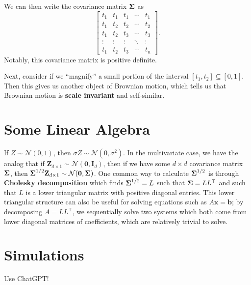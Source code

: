 We can then write the covariance matrix $\boldsymbol{\Sigma}$ as $$ \begin{bmatrix}
	t_1 & t_1 & t_1 & \cdots & t_1 \\
	t_1 & t_2 & t_2 & \cdots & t_2 \\
	t_1 & t_2 & t_3 & \cdots & t_3 \\
	\vdots & \vdots & \vdots & \ddots & \vdots \\
	t_1 & t_2 & t_3 & \cdots & t_n
\end{bmatrix}. $$ Notably, this covariance matrix is positive definite.

Next, consider if we ``magnify'' a small portion of the interval $[t_1,t_2]\subseteq[0,1]$. Then this gives us another object of Brownian motion, which tells us that Brownian motion is \textbf{scale invariant} and self-similar.


\section{Some Linear Algebra}
If $Z\sim\mathcal N(0,1)$, then $\sigma Z\sim\mathcal N(0,\sigma^2)$. In the multivariate case, we have the analog that if $\mathbf Z_{d\times 1}\sim\mathcal N(\mathbf 0,\mathbf I_d)$, then if we have some $d\times d$ covariance matrix $\boldsymbol{\Sigma}$, then $\boldsymbol{\Sigma}^{1/2}\mathbf Z_{d\times 1}\sim\mathcal N(\mathbf 0,\boldsymbol{\Sigma})$. One common way to calculate $\boldsymbol{\Sigma}^{1/2}$ is through \textbf{Cholesky decomposition} which finds $\boldsymbol{\Sigma}^{1/2}=L$ such that $\boldsymbol{\Sigma} = LL^\top$ and such that $L$ is a lower triangular matrix with positive diagonal entries. This lower triangular structure can also be useful for solving equations such as $A\mathbf x=\mathbf b$; by decomposing $A=LL^\top$, we sequentially solve two systems which both come from lower diagonal matrices of coefficients, which are relatively trivial to solve.


\section{Simulations}
Use ChatGPT!

